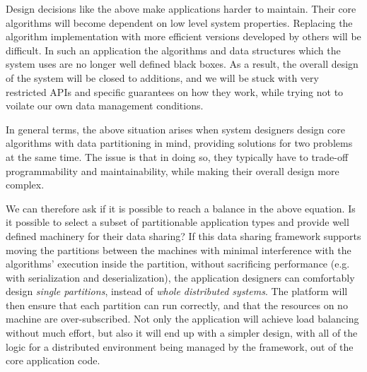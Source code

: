 Design decisions like the above make applications harder to maintain. Their
core algorithms will become dependent on low level system properties.
Replacing the
algorithm implementation with more efficient versions developed by others will
be difficult. In such an application
the algorithms and data structures which the system uses are no longer well
defined black boxes. As a result, the overall design of the system will be
closed to additions, and we will be stuck with very restricted APIs and specific
guarantees on how they work, while trying not to voilate our own data management
conditions.

In general terms, the above situation arises when system designers design
core algorithms with data partitioning in mind, providing solutions for two
problems at the same time. The issue is that in doing so, they typically have to
trade-off programmability and maintainability, while making their overall design
more complex.

We can therefore ask if it is possible to reach a balance in the above equation.
Is it possible to select a subset of partitionable application types
and provide well defined machinery for their data sharing? If this data sharing
framework supports moving the partitions between the machines with minimal
interference with the algorithms' execution inside the partition, without
sacrificing performance (e.g. with serialization and deserialization), the
application designers can comfortably design \emph{single partitions}, instead
of \emph{whole distributed systems}. The platform will then ensure that each
partition can run correctly, and that the resources on no machine are
over-subscribed. Not only the application will achieve load balancing without
much effort,
but also it will end up with a simpler design, with all
of the logic for a distributed environment being managed by the framework,
out of the core application code.

